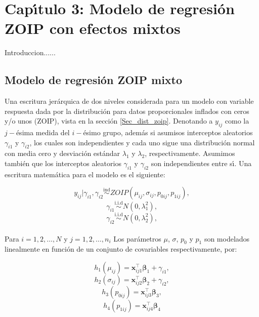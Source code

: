 \chapter{Cap\'{\i}tulo 3: Modelo de regresi\'{o}n ZOIP con efectos mixtos}

Introduccion......


\section{Modelo de regresi\'{o}n ZOIP mixto}


Una escritura jer\'{a}rquica de dos niveles considerada para un modelo con variable respuesta dada por la distribuci\'{o}n para datos proporcionales inflados con ceros y/o unos (ZOIP), vista en la secci\'{o}n \ref{Sec_dist_zoip}. Denotando a $y_{ij}$ como la $j-$\'{e}sima medida del $i-$\'{e}simo grupo, adem\'{a}s si asumisos interceptos aleatorios $\gamma_{i1}$ y $\gamma_{i2}$, los cuales son independientes y cada uno sigue una distribuci\'{o}n normal con media cero y desviaci\'{o}n est\'{a}ndar $\lambda_1$ y $\lambda_2$, respectivamente. Asumimos tambi\'{e}n que los interceptos aleatorios $\gamma_{i1}$ y $\gamma_{i2}$ son independientes entre s\'{\i}. Una escritura matem\'{a}tica para el modelo es el siguiente:

\[
y_{ij}| \gamma_{i1},\gamma_{i2} \overset{\text{ind}}{\sim} ZOIP(\mu_{ij},\sigma_{ij},p_{0ij}, p_{1ij}),
\]
\[
\gamma_{i1} \overset{\text{i.i.d}}{\sim}  N(0,\lambda_1^2),
\]
\[
\gamma_{i2} \overset{\text{i.i.d}}{\sim}  N(0,\lambda_2^2),
\]
\\
Para $i=1,2,\ldots, N$ y $j=1,2,\ldots, n_i$ Los par\'{a}metros $\mu$, $\sigma$, $p_0$ y $p_1$ son modelados linealmente en funci\'{o}n de un conjunto de covariables respectivamente, por:


\[
h_1(\mu_{ij})=\mathbf{x}_{ij1}^{\top} \boldsymbol{\beta}_1+ \gamma_{i1},
\]
\[
h_2(\sigma_{ij})=\mathbf{x}_{ij2}^{\top} \boldsymbol{\beta}_2+ \gamma_{i2},
\]
\[
h_3(p_{0ij})=\mathbf{x}_{ij3}^{\top} \boldsymbol{\beta}_3,
\]
\[
h_4(p_{1ij})=\mathbf{x}_{ij4}^{\top} \boldsymbol{\beta}_4
\]



